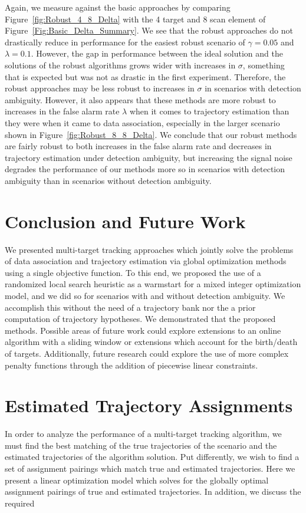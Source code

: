 \documentclass[journal]{IEEEtran}
\begin{document}
Again, we measure against the basic approaches by comparing Figure~\ref{fig:Robust_4_8_Delta} with the 4 target and 8 scan element of Figure~\ref{Fig:Basic_Delta_Summary}. We see that the robust approaches do not drastically reduce in performance for the easiest robust scenario of $\gamma = 0.05$ and $\lambda = 0.1$. However, the gap in performance between the ideal solution and the solutions of the robust algorithms grows wider with increases in $\sigma$, something that is expected but was not as drastic in the first experiment. Therefore, the robust approaches may be less robust to increases in $\sigma$ in scenarios with detection ambiguity. However, it also appears that these methods are more robust to increases in the false alarm rate $\lambda$ when it comes to trajectory estimation than they were when it came to data association, especially in the larger scenario shown in Figure~\ref{fig:Robust_8_8_Delta}. We conclude that our robust methods are fairly robust to both increases in the false alarm rate and decreases in trajectory estimation under detection ambiguity, but increasing the signal noise degrades the performance of our methods more so in scenarios with detection ambiguity than in scenarios without detection ambiguity.

\section{Conclusion and Future Work}\label{sec:Conclusion}
We presented multi-target tracking approaches which jointly solve the problems of data association and trajectory estimation via global optimization methods using a single objective function. To this end, we proposed the use of a randomized local search heuristic as a warmstart for a mixed integer optimization model, and we did so for scenarios with and without detection ambiguity. We accomplish this without the need of a trajectory bank nor the a prior computation of trajectory hypotheses. We demonstrated that the proposed methods. Possible areas of future work could explore extensions to an online algorithm with a sliding window or extensions which account for the birth/death of targets. Additionally, future research could explore the use of more complex penalty functions through the addition of piecewise linear constraints. 

\appendices
\section{Estimated Trajectory Assignments}\label{sec:Assignment_Appendix}
In order to analyze the performance of a multi-target tracking algorithm, we must find the best matching of the true trajectories of the scenario and the estimated trajectories of the algorithm solution. Put differently, we wish to find a set of assignment pairings which match true and estimated trajectories. Here we present a linear optimization model which solves for the globally optimal assignment pairings of true and estimated trajectories. In addition, we discuss the required 
\end{document}
